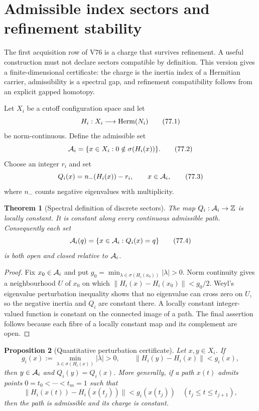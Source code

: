 \documentclass[11pt]{article}
\newtheorem{theorem}{Theorem}[section]
\newtheorem{proposition}[theorem]{Proposition}
\begin{document}
\section{Admissible index sectors and refinement stability}
\label{sec:v11v77}

The first acquisition row of V76 is a charge that survives refinement.
A useful construction must not declare sectors compatible by
definition.  This version gives a finite-dimensional certificate:
the charge is the inertia index of a Hermitian carrier, admissibility
is a spectral gap, and refinement compatibility follows from an
explicit gapped homotopy.

Let \(X_i\) be a cutoff configuration space and let
\[
                    H_i:X_i\longrightarrow {\rm Herm}(N_i)    \tag{77.1}
\]
be norm-continuous.  Define the admissible set
\[
 {\cal A}_i=\{x\in X_i:0\notin\sigma(H_i(x))\}.                \tag{77.2}
\]
Choose an integer \(r_i\) and set
\[
                    Q_i(x)=n_-(H_i(x))-r_i,\qquad x\in{\cal A}_i,
                                                                    \tag{77.3}
\]
where \(n_-\) counts negative eigenvalues with multiplicity.

\begin{theorem}[Spectral definition of discrete sectors]
\label{thm:v11v77-index}
The map \(Q_i:{\cal A}_i\to\mathbb Z\) is locally constant.  It is
constant along every continuous admissible path.  Consequently each
set
\[
                    {\cal A}_i(q)=\{x\in{\cal A}_i:Q_i(x)=q\} \tag{77.4}
\]
is both open and closed relative to \({\cal A}_i\).
\end{theorem}

\begin{proof}
Fix \(x_0\in{\cal A}_i\) and put
\(g_0=\min_{\lambda\in\sigma(H_i(x_0))}|\lambda|>0\).
Norm continuity gives a neighbourhood \(U\) of \(x_0\) on which
\(\|H_i(x)-H_i(x_0)\|<g_0/2\).  Weyl's eigenvalue perturbation
inequality shows that no eigenvalue can cross zero on \(U\), so the
negative inertia and \(Q_i\) are constant there.  A locally constant
integer-valued function is constant on the connected image of a path.
The final assertion follows because each fibre of a locally constant
map and its complement are open.
\end{proof}

\begin{proposition}[Quantitative perturbation certificate]
\label{prop:v11v77-perturb}
Let \(x,y\in X_i\).  If
\[
 g_i(x):=\min_{\lambda\in\sigma(H_i(x))}|\lambda|>0,\qquad
 \|H_i(y)-H_i(x)\|<g_i(x),                                   \tag{77.5}
\]
then \(y\in{\cal A}_i\) and \(Q_i(y)=Q_i(x)\).  More generally, if a
path \(x(t)\) admits points
\(0=t_0<\cdots<t_m=1\) such that
\[
 \|H_i(x(t))-H_i(x(t_j))\|<g_i(x(t_j))
 \quad(t_j\le t\le t_{j+1}),                                 \tag{77.6}
\]
then the path is admissible and its charge is constant.
\end{proposition}
\end{document}
